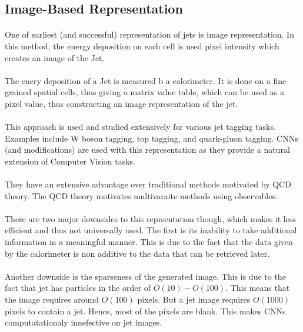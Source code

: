 \subsection{Image-Based Representation}

\paragraph{} One of earliest (and successful) representation of jets is image representation.  In this method, the energy deposition on each cell is used pixel intensity which creates an image of the Jet.

\paragraph{} The enery deposition of a Jet is measured b a calorimeter. It is done on a fine-grained spatial cells, thus giving a matrix value table, which can be  used as a pixel value, thus constructing an image representation of the jet.

\paragraph{} This approach is used and studied extensively for various jet tagging tasks. Examples include W boson tagging, top tagging, and quark-gluon tagging.  CNNs (and modifications) are used with this representation as they provide a natural extension of Computer Vision tasks.

\paragraph{} They have an extensive advantage over traditional methods motivated by QCD theory. The QCD theory motivates multivaraite methods using observables. 

\paragraph{} There are two major downsides to this reprsentation though, which makes it less efficient and thus not universally used. The first is its inability to take additional information in a meaningful manner. This is due to the fact that the data given by the calorimeter is non additive to the data that can be retrieved later.

\paragraph{} Another downside is the sparseness of the generated image. This is due to the fact that jet has particles in the order of $O(10) - O(100)$. This means that the image requires around $O(100)$ pixels. But a jet image requires $O(1000)$ pixels to contain a jet. Hence, most of the pixels are blank. This makes CNNs computatationaly innefective on jet images.

